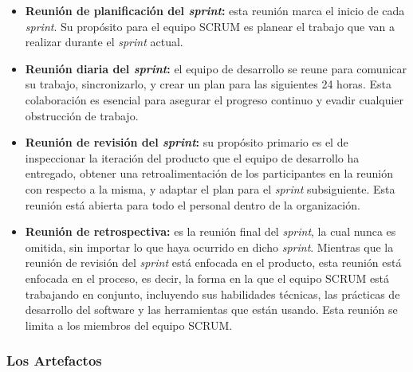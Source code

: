 			\begin{itemize}
				\item \textbf{Reuni\'{o}n de planificaci\'{o}n del \textit{sprint}: }
				esta reuni\'{o}n marca el inicio de cada \textit{sprint}. Su prop\'{o}sito para el equipo SCRUM es planear el trabajo que van a realizar durante el \textit{sprint} actual.
				
				\item \textbf{Reuni\'{o}n diaria del \textit{sprint}: }
				el equipo de desarrollo se reune para comunicar su trabajo, sincronizarlo, y crear un plan para las siguientes 24 horas. Esta colaboraci\'{o}n es esencial para asegurar el progreso continuo y evadir cualquier obstrucci\'{o}n de trabajo.
				
				\item \textbf{Reuni\'{o}n de revisi\'{o}n del \textit{sprint}: }
				su prop\'{o}sito primario es el de inspeccionar la iteraci\'{o}n del producto que el equipo de desarrollo ha entregado, obtener una retroalimentaci\'{o}n de los participantes en la reuni\'{o}n con respecto a la misma, y adaptar el plan para el \textit{sprint} subsiguiente. Esta reuni\'{o}n est\'{a} abierta para todo el personal dentro de la organizaci\'{o}n.
				
				\item \textbf{Reuni\'{o}n de retrospectiva: }
				es la reuni\'{o}n final del \textit{sprint}, la cual nunca es omitida, sin importar lo que haya ocurrido en dicho \textit{sprint}. Mientras que la reuni\'{o}n de revisi\'{o}n del \textit{sprint} est\'{a} enfocada en el producto, esta reuni\'{o}n est\'{a} enfocada en el proceso, es decir, la forma en la que el equipo SCRUM est\'{a} trabajando en conjunto, incluyendo sus habilidades t\'{e}cnicas, las pr\'{a}cticas de desarrollo del software y las herramientas que est\'{a}n usando. Esta reuni\'{o}n se limita a los miembros del equipo SCRUM.
				
			\end{itemize}
			
		\subsubsection{Los Artefactos}
			
